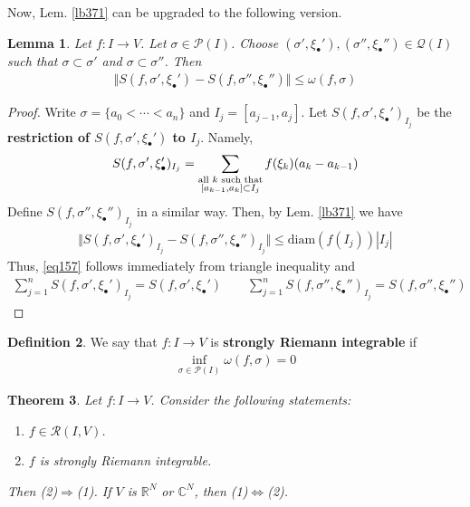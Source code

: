 \documentclass[12pt,b5paper,notitlepage]{article}
\theoremstyle{definition}
\newtheorem{df}{Definition}[section]
\theoremstyle{plain}
\newtheorem{thm}[df]{Theorem}
\newtheorem{lm}[df]{Lemma}
\newcommand{\mc}{\mathcal}
\newcommand{\scr}{\mathscr}
\newcommand{\blt}{\bullet}
\newcommand{\Cbb}{\mathbb C}
\newcommand{\Rbb}{\mathbb R}
\newcommand{\diam}{\mathrm{diam}}
\numberwithin{equation}{section}
\begin{document}
Now, Lem. \ref{lb371} can be upgraded to the following version.

\begin{lm}\label{lb373}
Let $f:I\rightarrow V$. Let $\sigma\in\mc P(I)$. Choose $(\sigma',\xi_\blt'),(\sigma'',\xi_\blt'')\in\mc Q(I)$ such that $\sigma\subset\sigma'$ and $\sigma\subset\sigma''$. Then
\begin{align}
\Vert S(f,\sigma',\xi_\blt')-S(f,\sigma'',\xi_\blt'')\Vert\leq \omega(f,\sigma)  \label{eq157}
\end{align}
\end{lm}



\begin{proof}
Write $\sigma=\{a_0<\cdots<a_n\}$ and $I_j=[a_{j-1},a_j]$. Let $S(f,\sigma',\xi_\blt')_{I_j}$ be the \textbf{restriction of $S(f,\sigma',\xi_\blt')$ to $I_j$}. Namely, 
\begin{align}
S(f,\sigma',\xi_\blt')_{I_j}=\sum_{
\begin{subarray}{c}
\text{all $k$ such that}\\
[a_{k-1},a_k]\subset I_j
\end{subarray}
} f(\xi_k)(a_k-a_{k-1})
\end{align} 
Define $S(f,\sigma'',\xi_\blt'')_{I_j}$ in a similar way. Then, by Lem. \ref{lb371} we have
\begin{align*}
\Vert S(f,\sigma',\xi_\blt')_{I_j}-S(f,\sigma'',\xi_\blt'')_{I_j}\Vert\leq \diam(f(I_j))|I_j|
\end{align*}
Thus, \eqref{eq157} follows immediately from triangle inequality and
\begin{align*}
\sum_{j=1}^n  S(f,\sigma',\xi_\blt')_{I_j}= S(f,\sigma',\xi_\blt')\qquad \sum_{j=1}^n  S(f,\sigma'',\xi_\blt'')_{I_j}= S(f,\sigma'',\xi_\blt'')
\end{align*}
\end{proof}



\begin{df}
We say that $f:I\rightarrow V$ is \textbf{strongly Riemann integrable}  if 
\begin{align*}
\inf_{\sigma\in\mc P(I)} \omega(f,\sigma)=0
\end{align*}
\end{df}

\begin{thm}
Let $f:I\rightarrow V$. Consider the following statements:
\begin{enumerate}[label=(\arabic*)]
\item $f\in\scr R(I,V)$.
\item $f$ is strongly Riemann integrable.
\end{enumerate}
Then (2)$\Rightarrow$(1). If $V$ is $\Rbb^N$ or $\Cbb^N$, then (1)$\Leftrightarrow$(2).
\end{thm}
\end{document}
